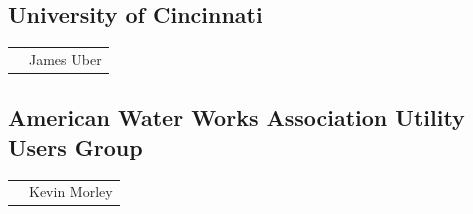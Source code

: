 \subsection*{University of Cincinnati}
\begin{tabular}{ll}
& James Uber\\
\end{tabular}

\subsection*{American Water Works Association Utility Users Group}
\begin{tabular}{ll}
& Kevin Morley\\%
\end{tabular}

